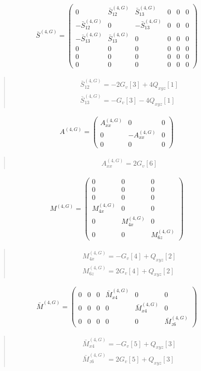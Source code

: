 \documentclass[fleqn,10pt]{jsarticle}
\begin{document}
\begin{align*}
\bar{S}^{(4,G)} = \begin{pmatrix} 0 & \bar{S}^{(4,G)}_{12} & \bar{S}^{(4,G)}_{13} & 0 & 0 & 0 \\ - \bar{S}^{(4,G)}_{12} & 0 & - \bar{S}^{(4,G)}_{13} & 0 & 0 & 0 \\ - \bar{S}^{(4,G)}_{13} & \bar{S}^{(4,G)}_{13} & 0 & 0 & 0 & 0 \\ 0 & 0 & 0 & 0 & 0 & 0 \\ 0 & 0 & 0 & 0 & 0 & 0 \\ 0 & 0 & 0 & 0 & 0 & 0 \end{pmatrix}
\end{align*}
\begin{quote}
\begin{align*}
& \bar{S}^{(4,G)}_{12} = - 2 G_{v}[3] + 4 Q_{xyz}[1] \\
& \bar{S}^{(4,G)}_{13} = - G_{v}[3] - 4 Q_{xyz}[1]
\end{align*}
\end{quote}
\begin{align*}
A^{(4,G)} = \begin{pmatrix} A^{(4,G)}_{xx} & 0 & 0 \\ 0 & - A^{(4,G)}_{xx} & 0 \\ 0 & 0 & 0 \end{pmatrix}
\end{align*}
\begin{quote}
\begin{align*}
& A^{(4,G)}_{xx} = 2 G_{v}[6]
\end{align*}
\end{quote}
\begin{align*}
M^{(4,G)} = \begin{pmatrix} 0 & 0 & 0 \\ 0 & 0 & 0 \\ 0 & 0 & 0 \\ M^{(4,G)}_{4x} & 0 & 0 \\ 0 & M^{(4,G)}_{4x} & 0 \\ 0 & 0 & M^{(4,G)}_{6z} \end{pmatrix}
\end{align*}
\begin{quote}
\begin{align*}
& M^{(4,G)}_{4x} = - G_{v}[4] + Q_{xyz}[2] \\
& M^{(4,G)}_{6z} = 2 G_{v}[4] + Q_{xyz}[2]
\end{align*}
\end{quote}
\begin{align*}
\bar{M}^{(4,G)} = \begin{pmatrix} 0 & 0 & 0 & \bar{M}^{(4,G)}_{x4} & 0 & 0 \\ 0 & 0 & 0 & 0 & \bar{M}^{(4,G)}_{x4} & 0 \\ 0 & 0 & 0 & 0 & 0 & \bar{M}^{(4,G)}_{z6} \end{pmatrix}
\end{align*}
\begin{quote}
\begin{align*}
& \bar{M}^{(4,G)}_{x4} = - G_{v}[5] + Q_{xyz}[3] \\
& \bar{M}^{(4,G)}_{z6} = 2 G_{v}[5] + Q_{xyz}[3]
\end{align*}
\end{quote}
\end{document}
